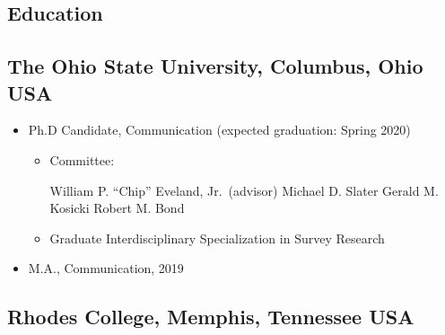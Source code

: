 \documentclass[letterpaper,MMMyyyy,nonstopmode]{simplecv}
\begin{document}
\begin{Body}

\vspace{-.4in} %

\raggedright

\hypertarget{education}{%
\section{Education}\label{education}}

\hypertarget{the-ohio-state-university-columbus-ohio-usa}{%
\subsection{\texorpdfstring{The Ohio State University,
\normalfont Columbus, Ohio
USA}{The Ohio State University, Columbus, Ohio USA}}\label{the-ohio-state-university-columbus-ohio-usa}}

\begin{itemize}
\item
  Ph.D Candidate, Communication (expected graduation: Spring 2020)

  \begin{itemize}
  \item
    Committee:

    \smallskip

    William P. \enquote{Chip} Eveland, Jr.~(advisor) \hspace{.05in}
    \textbullet \hspace{.05in} Michael D. Slater \hspace{.05in}
    \textbullet \hspace{.05in} Gerald M. Kosicki \hspace{.05in}
    \textbullet \hspace{.05in} Robert M. Bond

    \smallskip
  \item
    Graduate Interdisciplinary Specialization in Survey Research
  \end{itemize}
\item
  M.A., Communication, 2019
\end{itemize}

\hypertarget{rhodes-college-memphis-tennessee-usa}{%
\subsection{\texorpdfstring{Rhodes College, \normalfont Memphis,
Tennessee
USA}{Rhodes College, Memphis, Tennessee USA}}\label{rhodes-college-memphis-tennessee-usa}}


\end{Body}
\end{document}
